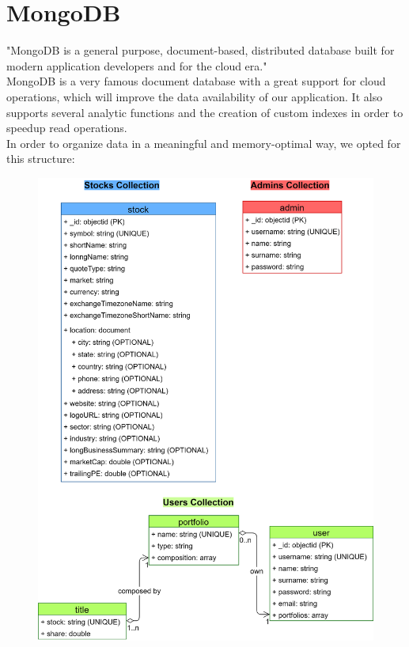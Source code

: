 \section{MongoDB}
"MongoDB is a general purpose, document-based, distributed database built for
modern application developers and for the cloud era."\\
MongoDB is a very famous document database with a great support for cloud
operations, which will improve the data availability of our application. It also
supports several analytic functions and the creation of custom indexes in order
to speedup read operations.\\
In order to organize data in a meaningful and memory-optimal way, we opted for
this structure:
\begin{figure}[H]
	\begin{center}
		\includegraphics[scale=0.14]{img/mongoDB_schema.png}
	\end{center}
\end{figure}

